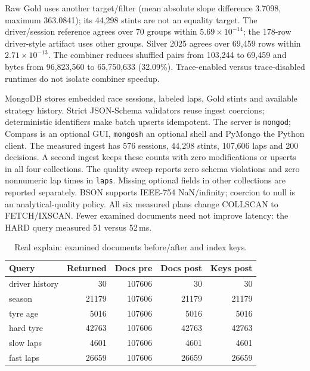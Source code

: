 \documentclass[11pt]{article}
\begin{document}
Raw Gold uses another target/filter (mean absolute slope difference 3.7098,
maximum 363.0841); its 44,298 stints are not an equality target.
The driver/session reference agrees over 70 groups within
$5.69\times10^{-14}$; the 178-row driver-style artifact uses other groups.
Silver 2025 agrees over 69,459 rows within $2.71\times10^{-13}$.
The combiner reduces shuffled pairs from 103,244 to 69,459 and bytes from
96,823,560 to 65,750,633 (32.09\%). Trace-enabled versus trace-disabled
runtimes do not isolate combiner speedup.

MongoDB stores embedded race sessions, labeled laps, Gold stints and
available strategy history. Strict JSON-Schema validators reuse ingest
coercions; deterministic identifiers make batch upserts idempotent.
The server is \texttt{mongod}; Compass is an optional GUI,
\texttt{mongosh} an optional shell and PyMongo the Python client.
The measured ingest has 576 sessions, 44,298 stints, 107,606 laps and
200 decisions. A second ingest keeps these counts with zero modifications
or upserts in all four collections. The quality sweep reports zero schema
violations and zero nonnumeric lap times in \texttt{laps}. Missing optional
fields in other collections are reported separately. BSON supports IEEE-754
NaN/infinity; coercion to null is an analytical-quality policy. All six
measured plans change COLLSCAN to FETCH/IXSCAN. Fewer examined documents
need not improve latency: the HARD query measured 51 versus 52\,ms.

\begin{table}[!htbp]\centering\scriptsize
\caption{Real explain: examined documents before/after and index keys.}
\label{tab:phase9-explain}
\begin{tabular}{lrrrr}\toprule
Query & Returned & Docs pre & Docs post & Keys post \\
\midrule
driver history & 30 & 107606 & 30 & 30 \\
season & 21179 & 107606 & 21179 & 21179 \\
tyre age & 5016 & 107606 & 5016 & 5016 \\
hard tyre & 42763 & 107606 & 42763 & 42763 \\
slow laps & 4601 & 107606 & 4601 & 4601 \\
fast laps & 26659 & 107606 & 26659 & 26659 \\
\bottomrule\end{tabular}\end{table}
\end{document}

